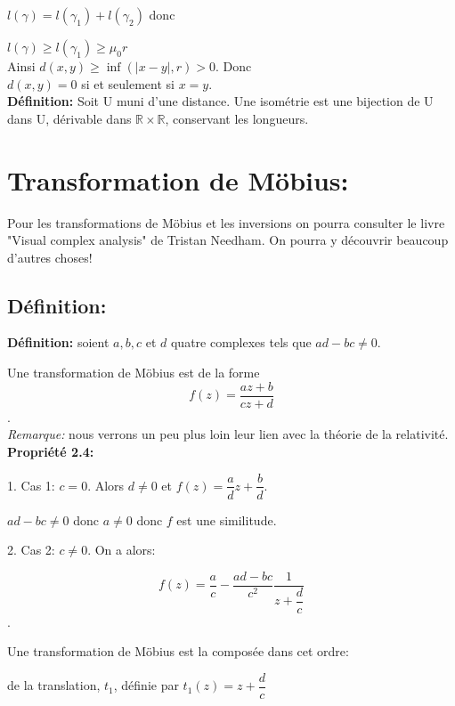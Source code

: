 \documentclass[a4paper, 12pt, twoside]{book}
\begin{document}
   $l(\gamma)= l(\gamma_{1})+l(\gamma_{2})$ donc\
   
   $l(\gamma)\geq l(\gamma_{1})\geq \mu_{0}r$\\
   
   Ainsi  $d(x,y)\geq \inf(|x-y|,r)>0$. Donc\\
   
   $d(x,y)=0$ si et seulement si $x=y$.\\
   
   
   \textbf{Définition:} Soit U muni d'une distance. Une isométrie est une  bijection de U dans U, dérivable dans $\mathbb{R\times R}$,  conservant les longueurs.\\
   
   
\newpage   \section{Transformation de Möbius:}
  
  Pour les transformations de Möbius et les inversions on pourra consulter le livre "Visual complex analysis" de Tristan Needham. On pourra y découvrir beaucoup d'autres choses!
    
  \subsection{Définition:}
  
   
   \textbf{Définition:} soient $a, b, c$ et $d$ quatre complexes tels que $ad-bc\neq 0$.\
   
    Une transformation de Möbius est de la forme $$f(z)=\dfrac{az+b}{cz+d}$$. \\
   
   \textit{Remarque:} nous verrons un peu plus loin leur lien avec la théorie de la relativité.\\
   
   \textbf{Propriété 2.4:} \
   
   1. Cas 1: $c=0$. Alors $d\neq0$ et  $f(z)=\dfrac{a}{d}z+\dfrac{b}{d}$.\
   
   
   $ad-bc\neq 0$ donc $a\neq0$ donc $f$ est  une similitude. \
   
   2. Cas 2: $c\neq 0$. On a alors:\
   
   $$f(z)=\dfrac{a}{c}-\dfrac{ad-bc}{c^{2}}\dfrac{1}{z+\dfrac{d}{c}}$$.\
   
  
   
   Une transformation de Möbius  est la composée dans cet ordre:\
    
     de la translation, $t_{1}$, définie par $t_{1}(z)=z+\dfrac{d}{c}$\
     
\end{document}
